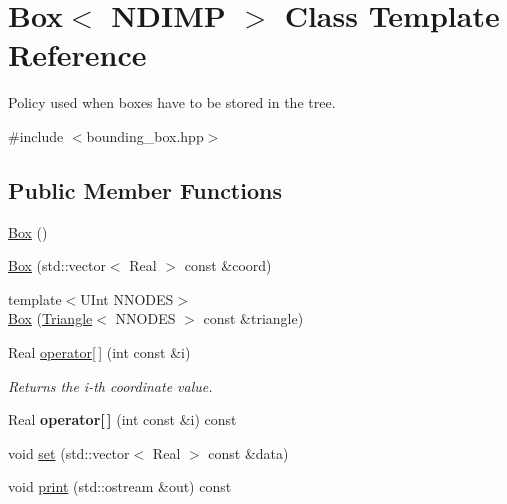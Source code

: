 \hypertarget{classBox}{
\section{Box$<$ NDIMP $>$ Class Template Reference}
\label{classBox}
}


Policy used when boxes have to be stored in the tree.  


{\ttfamily \#include $<$bounding\_\-box.hpp$>$}\subsection*{Public Member Functions}
\begin{DoxyCompactItemize}
\item 
\hyperlink{classBox_a7548150a557424f99283efb7c4210c9c}{Box} ()
\item 
\hyperlink{classBox_abebee9f400cfe9c76f5a954a989fae68}{Box} (std::vector$<$ Real $>$ const \&coord)
\item 
{\footnotesize template$<$UInt NNODES$>$ }\\\hyperlink{classBox_a60c887b1a652f979d556369c1fff3405}{Box} (\hyperlink{classTriangle}{Triangle}$<$ NNODES $>$ const \&triangle)
\item 
\hypertarget{classBox_a200d65939f4e06a24fe2a402676803e9}{
Real \hyperlink{classBox_a200d65939f4e06a24fe2a402676803e9}{operator\mbox{[}$\,$\mbox{]}} (int const \&i)}
\label{classBox_a200d65939f4e06a24fe2a402676803e9}

\begin{DoxyCompactList}\small\item\em Returns the i-\/th coordinate value. \item\end{DoxyCompactList}\item 
\hypertarget{classBox_a3f61ada09d0cf4bdc638f283a75c1232}{
Real {\bfseries operator\mbox{[}$\,$\mbox{]}} (int const \&i) const }
\label{classBox_a3f61ada09d0cf4bdc638f283a75c1232}

\item 
void \hyperlink{classBox_ab4053092717a3fabb8bdc88f28e20a9f}{set} (std::vector$<$ Real $>$ const \&data)
\item 
void \hyperlink{classBox_a625059fd5ee270a5392632825601154e}{print} (std::ostream \&out) const 
\end{DoxyCompactItemize}
